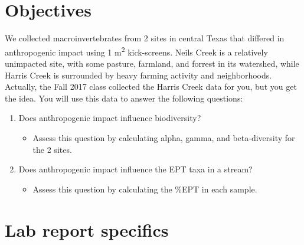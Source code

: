 \documentclass[]{book}
\providecommand{\tightlist}{%
  \setlength{\itemsep}{0pt}\setlength{\parskip}{0pt}}
\begin{document}
\hypertarget{objectives-3}{%
\section{Objectives}\label{objectives-3}}

We collected macroinvertebrates from 2 sites in central Texas that differed in anthropogenic impact using 1 m\textsuperscript{2} kick-screens. Neils Creek is a relatively unimpacted site, with some pasture, farmland, and forrest in its watershed, while Harris Creek is surrounded by heavy farming activity and neighborhoods. Actually, the Fall 2017 class collected the Harris Creek data for you, but you get the idea. You will use this data to answer the following questions:

\begin{enumerate}
\def\labelenumi{\arabic{enumi}.}
\tightlist
\item
  Does anthropogenic impact influence biodiversity?

  \begin{itemize}
  \tightlist
  \item
    Assess this question by calculating alpha, gamma, and beta-diversity for the 2 sites.
  \end{itemize}
\item
  Does anthropogenic impact influence the EPT taxa in a stream?

  \begin{itemize}
  \tightlist
  \item
    Assess this question by calculating the \%EPT in each sample.
  \end{itemize}
\end{enumerate}

\hypertarget{lab-report-specifics-3}{%
\section{Lab report specifics}\label{lab-report-specifics-3}}
\end{document}
